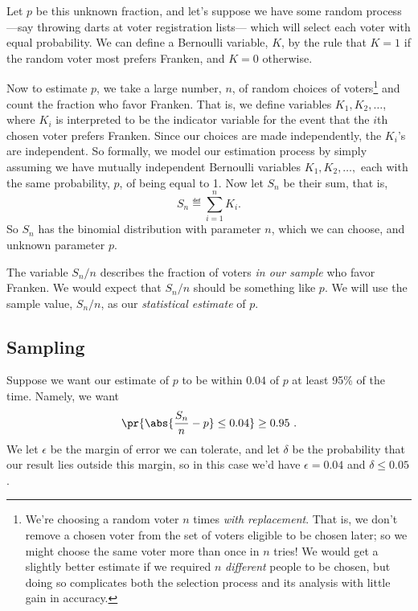 Let $p$ be this unknown fraction, and let's suppose we have some random
process ---say throwing darts at voter registration lists--- which will
select each voter with equal probability.  We can define a Bernoulli
variable, $K$, by the rule that $K=1$ if the random voter most prefers
Franken, and $K=0$ otherwise.

Now to estimate $p$, we take a large number, $n$, of random choices of
voters\footnote{We're choosing a random voter $n$ times \emph{with
replacement}.  That is, we don't remove a chosen voter from the set of
voters eligible to be chosen later; so we might choose the same voter more
than once in $n$ tries!  We would get a slightly better estimate if we
required $n$ \emph{different} people to be chosen, but doing so complicates
both the selection process and its analysis with little gain in accuracy.}
and count the fraction who favor Franken.  That is, we define variables $K_1,
K_2, \dots$, where $K_i$ is interpreted to be the indicator variable for
the event that the $i$th chosen voter prefers Franken.  Since our choices are
made independently, the $K_i$'s are independent.  So formally, we model our
estimation process by simply assuming we have mutually independent
Bernoulli variables $K_1, K_2, \dots,$ each with the same probability, $p$,
of being equal to 1.  Now let $S_n$ be their sum, that is,
\begin{equation}\label{LN12:Sn}
S_n \eqdef \sum_{i=1}^n K_i.
\end{equation}
So $S_n$ has the binomial distribution with parameter $n$, which we can
choose, and unknown parameter $p$.

The variable $S_n/n$ describes the fraction of voters \emph{in our sample}
who favor Franken.  We would expect that $S_n/n$ should
be something like $p$.
We will use the sample value, $S_n/n$, as our \emph{statistical estimate} of
$p$.

\subsection{Sampling}
Suppose we want our estimate of $p$ to be within $0.04$
of $p$ at least 95\% of the time.  Namely, we want
\[
\pr{\abs{\frac{S_n}{n} - p} \leq 0.04} \geq 0.95\ .
\]
We let $\epsilon$ be the margin of error we can tolerate, and let $\delta$
be the probability that our result lies outside this margin, so in this
case we'd have $\epsilon = 0.04$ and $\delta \le 0.05$.


